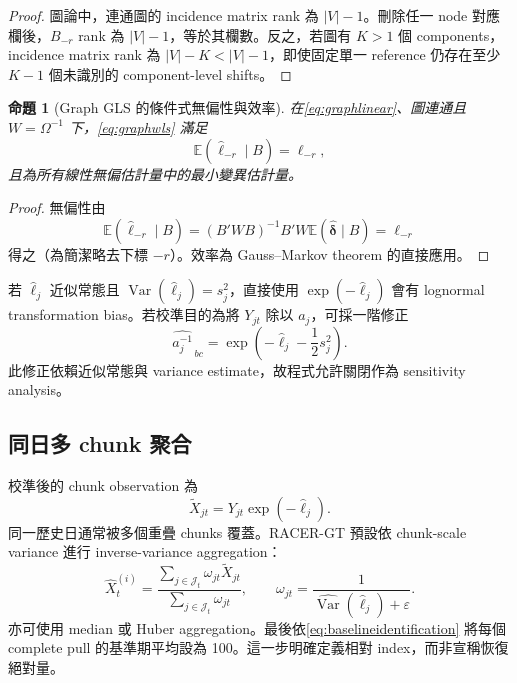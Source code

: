 \documentclass[12pt,a4paper,oneside]{article}
\newtheorem{proposition}{命題}[section]
\newcommand{\E}{\mathbb{E}}
\newcommand{\Var}{\operatorname{Var}}
\begin{document}
\begin{proof}
圖論中，連通圖的 incidence matrix rank 為 $|V|-1$。刪除任一 node 對應欄後，$B_{-r}$ rank 為 $|V|-1$，等於其欄數。反之，若圖有 $K>1$ 個 components，incidence matrix rank 為 $|V|-K<|V|-1$，即使固定單一 reference 仍存在至少 $K-1$ 個未識別的 component-level shifts。
\end{proof}

\begin{proposition}[Graph GLS 的條件式無偏性與效率]
在\cref{eq:graphlinear}、圖連通且 $W=\Omega^{-1}$ 下，\cref{eq:graphwls} 滿足
\begin{equation}
\E(\widehat{\bm\ell}_{-r}\mid B)=\bm\ell_{-r},
\end{equation}
且為所有線性無偏估計量中的最小變異估計量。
\end{proposition}

\begin{proof}
無偏性由
\[
\E(\widehat{\bm\ell}_{-r}\mid B)
=(B'WB)^{-1}B'W\E(\widehat{\bm\delta}\mid B)
=\bm\ell_{-r}
\]
得之（為簡潔略去下標 $-r$）。效率為 Gauss--Markov theorem 的直接應用。
\end{proof}

若 $\widehat\ell_j$ 近似常態且 $\Var(\widehat\ell_j)=s_j^2$，直接使用 $\exp(-\widehat\ell_j)$ 會有 lognormal transformation bias。若校準目的為將 $Y_{jt}$ 除以 $a_j$，可採一階修正
\begin{equation}
\widehat{a_j^{-1}}_{\,bc}
=\exp\left(-\widehat\ell_j-\frac{1}{2}s_j^2\right).
\label{eq:lognormalcorrection}
\end{equation}
此修正依賴近似常態與 variance estimate，故程式允許關閉作為 sensitivity analysis。

\subsection{同日多 chunk 聚合}

校準後的 chunk observation 為
\begin{equation}
\widetilde X_{jt}=Y_{jt}\exp(-\widehat\ell_j).
\end{equation}
同一歷史日通常被多個重疊 chunks 覆蓋。RACER-GT 預設依 chunk-scale variance 進行 inverse-variance aggregation：
\begin{equation}
\widehat X^{(i)}_t
=\frac{\sum_{j\in\mathcal{J}_t}\omega_{jt}\widetilde X_{jt}}
{\sum_{j\in\mathcal{J}_t}\omega_{jt}},
\qquad
\omega_{jt}=\frac{1}{\widehat{\Var}(\widehat\ell_j)+\varepsilon}.
\end{equation}
亦可使用 median 或 Huber aggregation。最後依\cref{eq:baselineidentification} 將每個 complete pull 的基準期平均設為 100。這一步明確定義相對 index，而非宣稱恢復絕對量。
\end{document}
